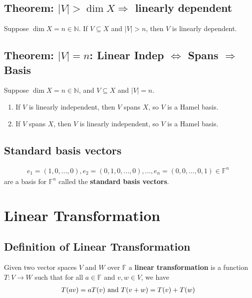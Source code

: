 \documentclass[11pt]{elegantbook}
\begin{document}
\subsection{Theorem: $|V|>\dim X \Rightarrow$ linearly dependent}
\begin{theorem}
    Suppose $\dim X = n \in \mathbb{N}$. If $V \subseteq X$ and $|V| > n$, then $V$ is linearly dependent.
\end{theorem}

\subsection{Theorem: $|V|=n$: Linear Indep $\Leftrightarrow$ Spans $\Rightarrow$ Basis}
\begin{theorem}[$|V|=n$: Linear Indep $\Leftrightarrow$ Spans $\Rightarrow$ Basis]
    Suppose $\dim X = n \in \mathbb{N}$, and $V \subseteq X$ and $|V| = n$.
    \begin{enumerate}
        \item If $V$ is linearly independent, then $V$ spans $X$, so $V$ is a Hamel basis.
        \item If $V$ spans $X$, then $V$ is linearly independent, so $V$ is a Hamel basis.
    \end{enumerate}
\end{theorem}





\subsection{Standard basis vectors}
\begin{equation}
    \begin{aligned}
        e_1=(1,0,...,0),e_2=(0,1,0,...,0),...,e_n=(0,0,...,0,1)\in \mathbb{F}^n
    \end{aligned}
    \nonumber
\end{equation}
are a basis for $\mathbb{F}^n$ called the \textbf{standard basis vectors}.


\section{Linear Transformation}
\subsection{Definition of Linear Transformation}
\begin{definition}
    \normalfont
    Given two vector spaces $V$ and $W$ over $\mathbb{F}$ a \textbf{linear transformation} is a function $T : V \rightarrow	 W$ such that
for all $a \in \mathbb{F}$ and $v,w \in V$, we have
\begin{equation}
    \begin{aligned}
        T(av)=aT(v) \textnormal{ and } T(v+w)=T(v)+T(w)
    \end{aligned}
    \nonumber
\end{equation}
\end{definition}
\end{document}
